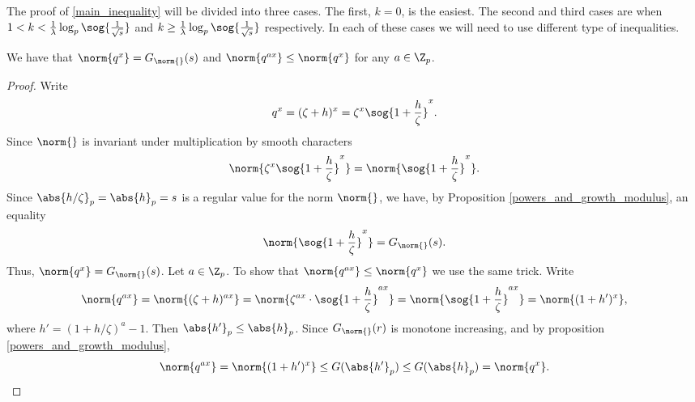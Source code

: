 The proof of \ref{main_inequality} will be divided into three cases.
The first, $k=0$, is the easiest.
The second and third cases are when  $1<k<\frac{1}{\lambda}\log_p\sog{\frac{1}{\sqrt{s}}}$ and $k\geq \frac{1}{\lambda}\log_p\sog{\frac{1}{\sqrt{s}}}$ respectively.
In each of these cases we will need to use different type of inequalities.


\begin{prop}\label{prop_norm_of_q^x}
We have that $\norm{q^x}=G_{\norm{}}(s)$ and $\norm{q^{ax}}\leq \norm{q^x}$ for any $a\in\Z_p$.
\end{prop} 
    \begin{proof}
    Write
    \[q^x=(\zeta+h)^x=\zeta^x\sog{1+\frac{h}{\zeta}}^x.\]
    Since $\norm{}$ is invariant under multiplication by smooth characters
    \[\norm{\zeta^x\sog{1+\frac{h}{\zeta}}^x}=\norm{\sog{1+\frac{h}{\zeta}}^x}.\]
    Since $\abs{h/\zeta}_p=\abs{h}_p=s$ is a regular value for the norm $\norm{}$, we have, by Proposition \ref{powers_and_growth_modulus}, an equality
    \[\norm{\sog{1+\frac{h}{\zeta}}^x}=G_{\norm{}}(s).\]
    Thus, $\norm{q^x}=G_{\norm{}}(s)$.
    Let $a\in\Z_p$.
    To show that $\norm{q^{ax}}\leq \norm{q^x}$ we use the same trick.
    Write
    \[\norm{q^{ax}}=\norm{(\zeta+h)^{ax}}=\norm{\zeta^{ax}\cdot\sog{1+\frac{h}{\zeta}}^{ax}}=\norm{\sog{1+\frac{h}{\zeta}}^{ax}}=\norm{(1+h')^x},\]
    where $h'=(1+h/\zeta)^a-1$.
    Then $\abs{h'}_p\leq \abs{h}_p$.
    Since $G_{\norm{}}(r)$ is monotone increasing, and by proposition \ref{powers_and_growth_modulus}, 
    \[\norm{q^{ax}}=\norm{(1+h')^x}\leq G(\abs{h'}_p)\leq G(\abs{h}_p)=\norm{q^x}.\]
    \end{proof} 

